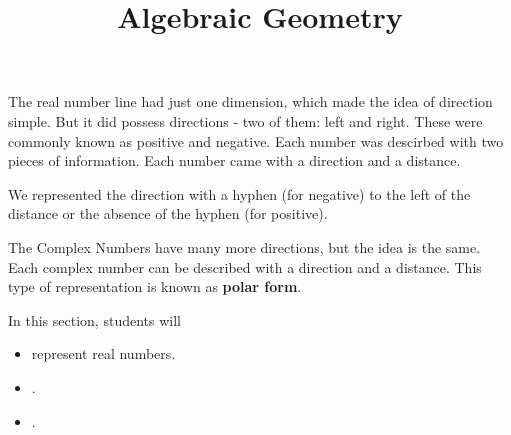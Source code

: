 \documentclass{ximera}
\title{Algebraic Geometry}
\begin{document}
\begin{abstract}
\end{abstract}
\maketitle





The real number line had just one dimension, which made the idea of direction simple.  But it did possess directions - two of them: left and right.  These were commonly known as positive and negative.  Each number was descirbed with two pieces of information.  Each number came with a direction and a distance.


We represented the direction with a hyphen (for negative) to the left of the distance or the absence of the hyphen (for positive).

The Complex Numbers have many more directions, but the idea is the same.  Each complex number can be described with a direction and a distance.  This type of representation is known as \textbf{polar form}.






\begin{sectionOutcomes}
In this section, students will 

\begin{itemize}
\item represent real numbers.
\item .
\item .
\end{itemize}
\end{sectionOutcomes}
\end{document}
